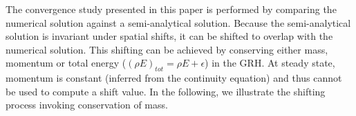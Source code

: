 \documentclass[times,doublespace]{fldauth}%
\begin{document}
The convergence study presented in this paper is performed by comparing the numerical solution against a semi-analytical solution.
Because the semi-analytical solution
is invariant under spatial shifts,  it can be shifted to overlap with the numerical solution.
This shifting can be achieved by conserving either mass, momentum or total energy ($(\rho E)_{tot}= \rho E + \epsilon$) %
in the GRH.
At steady state, momentum is constant (inferred from the continuity equation) and thus cannot be used to compute a shift value.
In the following, we illustrate the shifting process invoking conservation of mass. 
\end{document}
